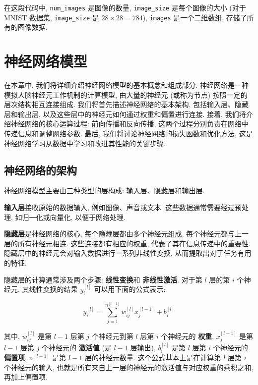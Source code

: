 \documentclass{ctexart}
\begin{document}
在这段代码中, \verb|num_images| 是图像的数量, \verb|image_size| 是每个图像的大小 (对于 MNIST 数据集,
\verb|image_size| 是 $28 \times 28 = 784$), \verb|images| 是一个二维数组, 存储了所有的图像数据.

\section{神经网络模型}
\label{sec::nn}

在本章中, 我们将详细介绍神经网络模型的基本概念和组成部分. 神经网络是一种模拟人脑神经元工作机制的计算模型,
由大量的神经元 (或称为节点) 按照一定的层次结构相互连接组成. 我们将首先描述神经网络的基本架构,
包括输入层、隐藏层和输出层, 以及这些层中的神经元如何通过权重和偏置进行连接. 接着, 我们将介绍神经网络的核心运算过程:
前向传播和反向传播, 这两个过程分别负责在网络中传递信息和调整网络参数. 最后, 我们将讨论神经网络的损失函数和优化方法,
这是神经网络学习从数据中学习和改进其性能的关键步骤.

\subsection{神经网络的架构}

神经网络模型主要由三种类型的层构成: 输入层、隐藏层和输出层\cite{goodfellow2016deep}.

{\bfseries 输入层}接收原始的数据输入, 例如图像、声音或文本. 这些数据通常需要经过预处理, 如归一化或向量化, 以便于网络处理.

{\bfseries 隐藏层}是神经网络的核心, 每个隐藏层都由多个神经元组成, 每个神经元都与上一层的所有神经元相连.
这些连接都有相应的权重, 代表了其在信息传递中的重要性. 隐藏层中的神经元会对输入数据进行一系列非线性变换, 从而提取出对于任务有用的特征\cite{lecun2015deep}.

隐藏层的计算通常涉及两个步骤: {\bfseries 线性变换}和 {\bfseries 非线性激活}. 对于第 $l$ 层的第 $i$ 个神经元,
其线性变换的结果 $y^{[l]}_i$ 可以用下面的公式表示:

\begin{equation}
    y^{[l]}_i = \sum_{j=1}^{n^{[l-1]}} w^{[l]}_{ij} x^{[l-1]}_j + b^{[l]}_i
\end{equation}

其中, $w^{[l]}_{ij}$ 是第 $l-1$ 层第 $j$ 个神经元到第 $l$ 层第 $i$ 个神经元的 {\bfseries 权重},
$x^{[l-1]}_j$ 是第 $l-1$ 层第 $j$ 个神经元的 {\bfseries 激活值} (是 $l - 1$ 层输出),
$b^{[l]}_i$ 是第 $l$ 层第 $i$ 个神经元的 {\bfseries 偏置项},
$n^{[l-1]}$ 是第 $l-1$ 层的神经元数量. 这个公式基本上是在计算第 $l$ 层第 $i$ 个神经元的输入,
也就是所有来自上一层的神经元的激活值与对应权重的乘积之和, 再加上偏置项.
\end{document}
